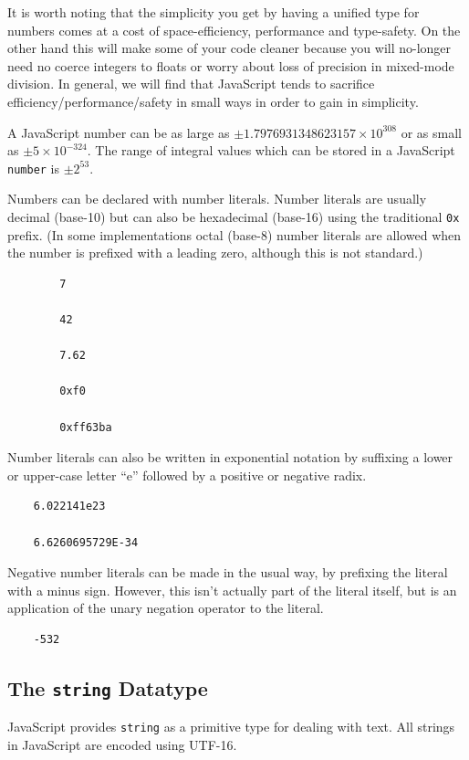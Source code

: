 \documentclass[11pt,letter]{book}
\begin{document}
    It is worth noting that the simplicity you get by having a unified type for numbers comes at 
    a cost of space-efficiency, performance and type-safety. On the other hand this will make 
    some of your code cleaner because you will no-longer need no coerce integers to floats or 
    worry about loss of precision in mixed-mode division. In general, we will find that 
    JavaScript tends to sacrifice efficiency/performance/safety in small ways in order to gain 
    in simplicity.
    
    A JavaScript number can be as large as $\pm 1.7976931348623157 \times 10^{308}$ or as small as
    $\pm 5 \times 10^{-324}$. The range of integral values which can be stored in a JavaScript 
    \texttt{number} is $\pm 2^{53}$.
    
    Numbers can be declared with number literals. Number literals are usually decimal (base-10) but 
    can also be hexadecimal (base-16) using the traditional \texttt{0x} prefix. (In some 
    implementations octal (base-8) number literals are allowed when the number is prefixed with a 
    leading zero, although this is not standard.)
    
    \begin{verbatim}
        7
    
        42
        
        7.62
        
        0xf0
    
        0xff63ba
    \end{verbatim}
    
    Number literals can also be written in exponential notation by suffixing a lower or upper-case 
    letter ``e'' followed by a positive or negative radix. 
    
    \begin{verbatim}
    6.022141e23
    
    6.6260695729E-34
    \end{verbatim}
    
    Negative number literals can be made in the usual way, by prefixing the literal with a minus 
    sign. However, this isn't actually part of the literal itself, but is an application of the 
    unary negation operator to the literal.
    
    \begin{verbatim}
    -532
    \end{verbatim}
    
    \subsection{The \texttt{string} Datatype}
    JavaScript provides \texttt{string} as a primitive type for dealing with text. All strings in 
    JavaScript are encoded using UTF-16.
    
\end{document}
